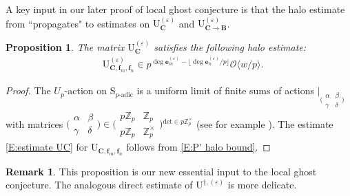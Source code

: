 \documentclass[12pt]{amsart}
\newtheorem{corollary}[subsection]{Corollary}
\newtheorem{proposition}[subsection]{Proposition}
\theoremstyle{definition}
\newtheorem{remark}[subsection]{Remark}
\numberwithin{equation}{subsection}
\def\calO{\mathcal{O}}
\def\bfB{\mathbf{B}}
\def\ZZ{\mathbb{Z}}
\def\bfe{\mathbf{e}}
\def\bff{\mathbf{f}}
\def\bfC{\mathbf{C}}
\def\rmM{\mathrm{M}}
\def\rmU{\mathrm{U}}
\def\rmS{\mathrm{S}}
\renewcommand{\det}{\mathrm{det}}
\newcommand{\Matrix}[4]{{\big(\begin{smallmatrix}#1&#2\\#3& #4\end{smallmatrix} \big)}}
\begin{document}
A key input in our later proof of local ghost conjecture is that the halo estimate from \cite{liu-wan-xiao} ``propagates" to estimates on $\rmU_\bfC^{(\varepsilon)}$ and $\rmU_{\bfC \to \bfB}^{(\varepsilon)}$.

\begin{proposition}
\label{P:halo estimate}
The matrix $\rmU_{\bfC}^{(\varepsilon)}$ satisfies the following halo estimate:
\begin{align}
\label{E:estimate UC}
&\rmU_{\bfC,\bff_m, \bff_n}^{(\varepsilon)} \in p^{\deg \bfe_m^{(\varepsilon)} - \lfloor \deg \bfe_n^{(\varepsilon)}/p\rfloor } \calO\langle w/p\rangle.
\end{align}
\end{proposition}
\begin{proof}
The $U_p$-action on $\rmS_{p\textrm{-adic}}$ is a uniform limit of finite sums of actions $|_{\Matrix \alpha\beta \gamma \delta}$ with matrices $\Matrix \alpha \beta\gamma \delta \in \Matrix{p\ZZ_p}{\ZZ_p}{p\ZZ_p}{\ZZ_p^\times}{}^{\det \in p\ZZ_p^\times}$ (see for example \cite[(2.9.1)]{liu-truong-xiao-zhao}).
The estimate \eqref{E:estimate UC} for $\rmU_{\bfC,\bff_m,\bff_n}$ follows from \eqref{E:P' halo bound}.
\end{proof}

\begin{remark}
This proposition is our new essential input to the local ghost conjecture. The analogous direct estimate of $\rmU^{\dagger, (\varepsilon)}$ is more delicate.
\end{remark}

\end{document}
